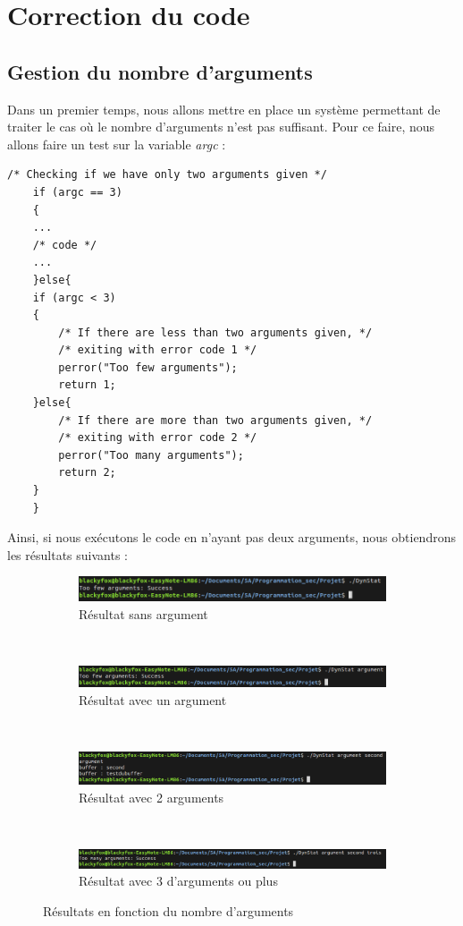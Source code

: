 \section{Correction du code}
\subsection{Gestion du nombre d'arguments}
Dans un premier temps, nous allons mettre en place un système permettant de traiter le cas où le nombre d'arguments n'est pas suffisant. Pour ce faire, nous allons faire un test sur la variable \textit{argc} :
\begin{lstlisting}
/* Checking if we have only two arguments given */
    if (argc == 3)
    {
    ...
    /* code */
    ...
    }else{
	if (argc < 3)
	{
	    /* If there are less than two arguments given, */
	    /* exiting with error code 1 */
	    perror("Too few arguments");
	    return 1;
	}else{
	    /* If there are more than two arguments given, */
	    /* exiting with error code 2 */
	    perror("Too many arguments");
	    return 2;
	}
    }
\end{lstlisting}
Ainsi, si nous exécutons le code en n'ayant pas deux arguments, nous obtiendrons les résultats suivants :
\begin{figure}[H]
 \centering
 \begin{subfigure}[b]{0.9\textwidth}
  \includegraphics[width=\textwidth]{img/corr1.png}
  \caption{Résultat sans argument}
  \label{img:8.1}
 \end{subfigure}
 ~
 \begin{subfigure}[b]{0.9\textwidth}
  \includegraphics[width=\textwidth]{img/corr2.png}
  \caption{Résultat avec un argument}
  \label{img:8.2}
 \end{subfigure}
 ~
 \begin{subfigure}[b]{0.9\textwidth}
  \includegraphics[width=\textwidth]{img/corr3.png}
  \caption{Résultat avec 2 arguments}
  \label{img:8.3}
 \end{subfigure}
 ~
 \begin{subfigure}[b]{0.9\textwidth}
  \includegraphics[width=\textwidth]{img/corr4.png}
  \caption{Résultat avec 3 d'arguments ou plus}
  \label{img:8.4}
 \end{subfigure}
 \caption{Résultats en fonction du nombre d'arguments}
\end{figure}

